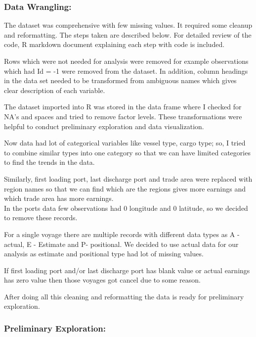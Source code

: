 \documentclass[]{article}
\begin{document}
\subsubsection{\texorpdfstring{\textbf{Data
Wrangling:}}{Data Wrangling:}}\label{data-wrangling}

The dataset was comprehensive with few missing values. It required some
cleanup and reformatting. The steps taken are described below. For
detailed review of the code, R markdown document explaining each step
with code is included.

Rows which were not needed for analysis were removed for example
observations which had Id = -1 were removed from the dataset. In
addition, column headings in the data set needed to be transformed from
ambiguous names which gives clear description of each variable.

The dataset imported into R was stored in the data frame where I checked
for NA's and spaces and tried to remove factor levels. These
transformations were helpful to conduct preliminary exploration and data
visualization.

Now data had lot of categorical variables like vessel type, cargo type;
so, I tried to combine similar types into one category so that we can
have limited categories to find the trends in the data.

Similarly, first loading port, last discharge port and trade area were
replaced with region names so that we can find which are the regions
gives more earnings and which trade area has more earnings.\\
In the ports data few observations had 0 longitude and 0 latitude, so we
decided to remove these records.

For a single voyage there are multiple records with different data types
as A - actual, E - Estimate and P- positional. We decided to use actual
data for our analysis as estimate and positional type had lot of missing
values.

If first loading port and/or last discharge port has blank value or
actual earnings has zero value then those voyages got cancel due to some
reason.

After doing all this cleaning and reformatting the data is ready for
preliminary exploration.

\subsubsection{\texorpdfstring{\textbf{Preliminary
Exploration:}}{Preliminary Exploration:}}\label{preliminary-exploration}
\end{document}
